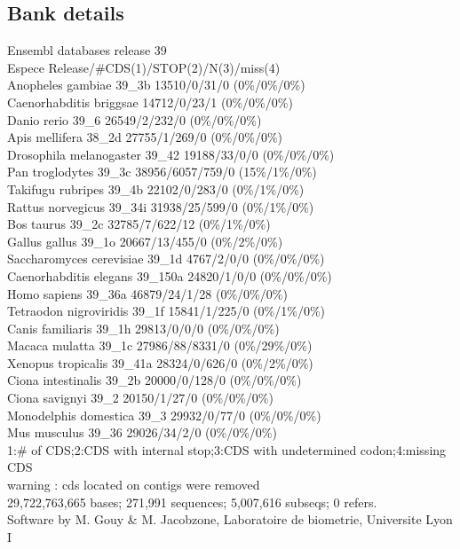 \documentclass{article}
\begin{document}
\begin{Schunk}
\subsection{Bank details}
Ensembl databases release 39\\
Espece                                  Release/\#CDS(1)/STOP(2)/N(3)/miss(4)\\
Anopheles gambiae                       39\_3b 13510/0/31/0 (0\%/0\%/0\%)\\
Caenorhabditis briggsae                  14712/0/23/1 (0\%/0\%/0\%)\\
Danio rerio                             39\_6 26549/2/232/0 (0\%/0\%/0\%)\\
Apis mellifera                          38\_2d 27755/1/269/0 (0\%/0\%/0\%)\\
Drosophila melanogaster                 39\_42 19188/33/0/0 (0\%/0\%/0\%)\\
Pan troglodytes                         39\_3c 38956/6057/759/0 (15\%/1\%/0\%)\\
Takifugu rubripes                       39\_4b 22102/0/283/0 (0\%/1\%/0\%)\\
Rattus norvegicus                       39\_34i 31938/25/599/0 (0\%/1\%/0\%)\\
Bos taurus                              39\_2c 32785/7/622/12 (0\%/1\%/0\%)\\
Gallus gallus                           39\_1o 20667/13/455/0 (0\%/2\%/0\%)\\
Saccharomyces cerevisiae                39\_1d 4767/2/0/0 (0\%/0\%/0\%)\\
Caenorhabditis elegans                  39\_150a 24820/1/0/0 (0\%/0\%/0\%)\\
Homo sapiens                            39\_36a 46879/24/1/28 (0\%/0\%/0\%)\\
Tetraodon nigroviridis                  39\_1f 15841/1/225/0 (0\%/1\%/0\%)\\
Canis familiaris                        39\_1h 29813/0/0/0 (0\%/0\%/0\%)\\
Macaca mulatta                          39\_1c 27986/88/8331/0 (0\%/29\%/0\%)\\
Xenopus tropicalis                      39\_41a 28324/0/626/0 (0\%/2\%/0\%)\\
Ciona intestinalis                      39\_2b 20000/0/128/0 (0\%/0\%/0\%)\\
Ciona savignyi                          39\_2 20150/1/27/0 (0\%/0\%/0\%)\\
Monodelphis domestica                   39\_3 29932/0/77/0 (0\%/0\%/0\%)\\
Mus musculus                            39\_36 29026/34/2/0 (0\%/0\%/0\%)\\
1:\# of CDS;2:CDS with internal stop;3:CDS with undetermined codon;4:missing CDS\\
warning : cds located on contigs were removed\\
29,722,763,665 bases; 271,991 sequences; 5,007,616 subseqs; 0 refers.\\
Software by M. Gouy \& M. Jacobzone, Laboratoire de biometrie, Universite Lyon I


\end{Schunk}
\end{document}

